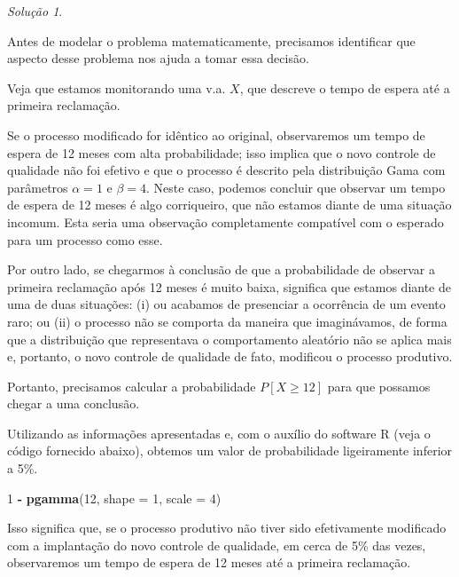 \documentclass[
]{book}
\newenvironment{Shaded}{\begin{snugshade}}{\end{snugshade}}
\newcommand{\DataTypeTok}[1]{\textcolor[rgb]{0.13,0.29,0.53}{#1}}
\newcommand{\DecValTok}[1]{\textcolor[rgb]{0.00,0.00,0.81}{#1}}
\newcommand{\KeywordTok}[1]{\textcolor[rgb]{0.13,0.29,0.53}{\textbf{#1}}}
\newcommand{\NormalTok}[1]{#1}
\newcommand{\OperatorTok}[1]{\textcolor[rgb]{0.81,0.36,0.00}{\textbf{#1}}}
\newcommand{\StringTok}[1]{\textcolor[rgb]{0.31,0.60,0.02}{#1}}
\theoremstyle{definition}
\theoremstyle{definition}
\theoremstyle{definition}
\theoremstyle{remark}
\newtheorem*{solution}{Solução}
\begin{document}
\begin{solution}
{}
\end{solution}

Antes de modelar o problema matematicamente, precisamos identificar que aspecto desse problema nos ajuda a tomar essa decisão.

Veja que estamos monitorando uma v.a. \(X\), que descreve o tempo de espera até a primeira reclamação.

Se o processo modificado for idêntico ao original, observaremos um tempo de espera de 12 meses com alta probabilidade; isso implica que o novo controle de qualidade não foi efetivo e que o processo é descrito pela distribuição Gama com parâmetros \(\alpha = 1\) e \(\beta = 4\). Neste caso, podemos concluir que observar um tempo de espera de 12 meses é algo corriqueiro, que não estamos diante de uma situação incomum. Esta seria uma observação completamente compatível com o esperado para um processo como esse.

Por outro lado, se chegarmos à conclusão de que a probabilidade de observar a primeira reclamação após 12 meses é muito baixa, significa que estamos diante de uma de duas situações: (i) ou acabamos de presenciar a ocorrência de um evento raro; ou (ii) o processo não se comporta da maneira que imaginávamos, de forma que a distribuição que representava o comportamento aleatório não se aplica mais e, portanto, o novo controle de qualidade de fato, modificou o processo produtivo.

Portanto, precisamos calcular a probabilidade \(P[X \geq 12]\) para que possamos chegar a uma conclusão.

Utilizando as informações apresentadas e, com o auxílio do software R (veja o código fornecido abaixo), obtemos um valor de probabilidade ligeiramente inferior a 5\%.

\begin{Shaded}
\begin{Highlighting}[]
\DecValTok{1} \OperatorTok{-}\StringTok{ }\KeywordTok{pgamma}\NormalTok{(}\DecValTok{12}\NormalTok{, }\DataTypeTok{shape =} \DecValTok{1}\NormalTok{, }\DataTypeTok{scale =} \DecValTok{4}\NormalTok{)}
\end{Highlighting}
\end{Shaded}

Isso significa que, se o processo produtivo não tiver sido efetivamente modificado com a implantação do novo controle de qualidade, em cerca de 5\% das vezes, observaremos um tempo de espera de 12 meses até a primeira reclamação.
\end{document}
